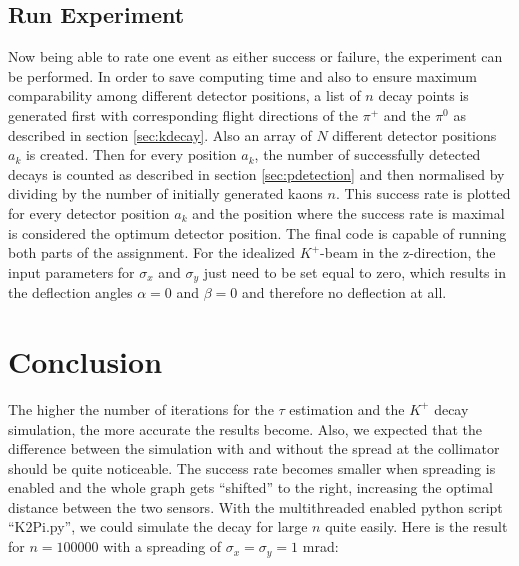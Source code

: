 \documentclass[a4paper,parskip,11pt, DIV12]{scrreprt}
\begin{document}
	\clearpage
	
	
	\section{Run Experiment}
	
	Now being able to rate one event as either success or failure, the experiment can be performed. In order to save computing time and also to ensure maximum comparability among different detector positions, a list of $n$ decay points is generated first with corresponding flight directions of the $\pi^+$ and the $\pi^0$ as described in section \ref{sec:kdecay}. Also an array of $N$ different detector positions $a_k$ is created. Then for every position $a_k$, the number of successfully detected decays is counted as described in section \ref{sec:pdetection} and then normalised by dividing by the number of initially generated kaons $n$. This success rate is plotted for every detector position $a_k$ and the position where the success rate is maximal is considered the optimum detector position. The final code is capable of running both parts of the assignment. For the idealized $K^+$-beam in the z-direction, the input parameters for $\sigma_x$ and $\sigma_y$ just need to be set equal to zero,  which results in the deflection angles $\alpha = 0$ and $\beta = 0$ and therefore no deflection at all.
	
	\clearpage
	
	
	\chapter{Conclusion}
	
	The higher the number of iterations for the $\tau$ estimation and the $K^+$ decay simulation, the more accurate the results become. 
	Also, we expected that the difference between the simulation with and without the spread at the collimator should be quite noticeable. The success rate becomes smaller when spreading is enabled and the whole graph gets “shifted” to the right, increasing the optimal distance between the two sensors. 
	With the multithreaded enabled python script “K2Pi.py”, we could simulate the decay for large $n$ quite easily. Here is the result for $n = 100000$ with a spreading of $\sigma_x=\sigma_y=1$ mrad:
	
\end{document}
